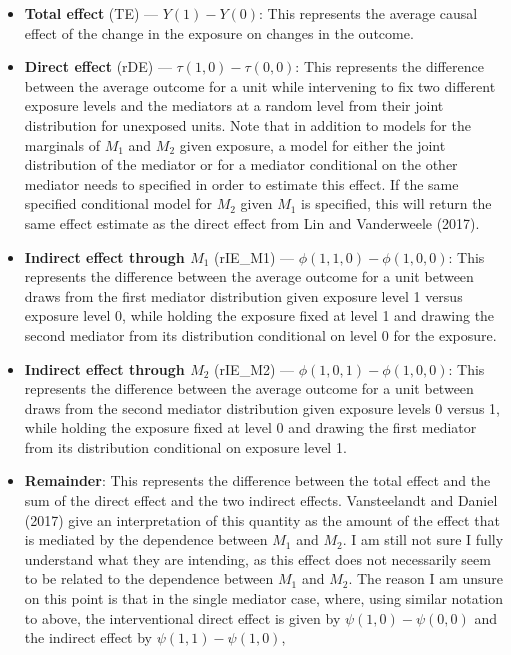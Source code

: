 \documentclass[12pt]{article} %
\numberwithin{equation}{section} %
\begin{document}
\begin{itemize}
\item \textbf{Total effect} (TE) --- $Y(1) - Y(0)$: This represents the average causal effect of the change in the exposure 
on changes in the outcome. 
\item \textbf{Direct effect} (rDE) --- $\tau(1,0) - \tau(0,0)$: This represents the difference between the average outcome
for a unit while intervening to fix two different exposure levels and the mediators at a random level from their joint distribution for
unexposed units. Note that in addition to models for the marginals of $M_{1}$ and $M_{2}$ given exposure, a model for either the 
joint distribution of the mediator or for a mediator conditional on the other mediator needs to specified in order to estimate this 
effect. If the same specified conditional model for $M_{2}$ given $M_{1}$ is specified, this will return the same
effect estimate as the direct effect from Lin and Vanderweele (2017). 
\item \textbf{Indirect effect through $M_{1}$} (rIE\_M1) --- $\phi(1,1,0) - \phi(1,0,0)$: This represents 
the difference between the average outcome for a unit between draws from the first mediator distribution given exposure level 1
versus exposure level 0, while holding the exposure fixed at level 1 and drawing the second mediator from its distribution conditional
on level 0 for the exposure.
\item \textbf{Indirect effect through $M_{2}$} (rIE\_M2) --- $\phi(1,0,1) - \phi(1,0,0)$: This represents 
the difference between the average outcome for a unit between draws from the second mediator distribution given exposure levels 0
versus 1, while holding the exposure fixed at level 0 and drawing the first mediator from its distribution conditional
on exposure level 1.
\item \textbf{Remainder}: This represents 
the difference between the total effect and the sum of the direct effect and the two indirect effects. Vansteelandt and Daniel (2017) 
give an interpretation of this quantity as the amount of the effect that is mediated by the dependence between $M_{1}$ and $M_{2}$. 
I am still not sure I fully understand what they are intending, as this effect does not necessarily seem to be related to the
dependence between $M_{1}$ and $M_{2}$. The reason I am unsure on this point is that in the single mediator case, where, using similar
notation to above, the interventional direct effect is given by $\psi(1,0) - \psi(0,0)$ and the indirect effect by $\psi(1,1) - \psi(1,0)$,

\end{itemize}
\end{document}
